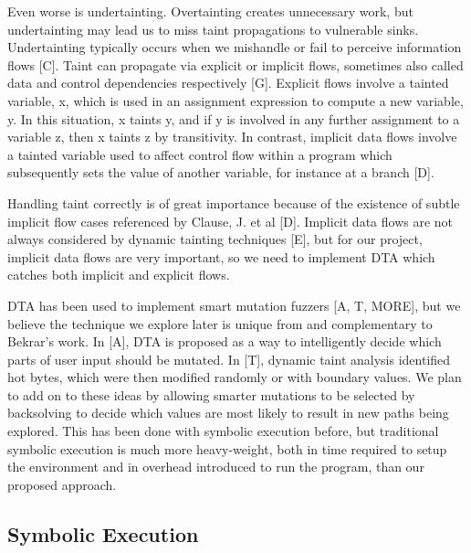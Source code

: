 \documentclass[11pt,expanded,copyright]{fsuthesis}
\begin{document}
Even worse is undertainting. Overtainting creates unnecessary work, but undertainting may lead us to miss taint propagations to vulnerable sinks. Undertainting typically occurs when we mishandle or fail to perceive information flows [C]. Taint can propagate via explicit or implicit flows, sometimes also called data and control dependencies respectively [G]. Explicit flows involve a tainted variable, x, which is used in an assignment expression to compute a new variable, y. In this situation, x taints y, and if y is involved in any further assignment to a variable z, then x taints z by transitivity. In contrast, implicit data flows involve a tainted variable used to affect control flow within a program which subsequently sets the value of another variable, for instance at a branch [D]. 

Handling taint correctly is of great importance because of the existence of subtle implicit flow cases referenced by Clause, J. et al [D]. Implicit data flows are not always considered by dynamic tainting techniques [E], but for our project, implicit data flows are very important, so we need to implement DTA which catches both implicit and explicit flows.




DTA has been used to implement smart mutation fuzzers [A, T, MORE], but we believe the technique we explore later is unique from and complementary to Bekrar's work. In [A], DTA is proposed as a way to intelligently decide which parts of user input should be mutated. In [T], dynamic taint analysis identified hot bytes, which were then modified randomly or with boundary values. We plan to add on to these ideas by allowing smarter mutations to be selected by backsolving to decide which values are most likely to result in new paths being explored. This has been done with symbolic execution before, but traditional symbolic execution is much more heavy-weight, both in time required to setup the environment and in overhead introduced to run the program, than our proposed approach.

\subsection{Symbolic Execution}

\end{document}
